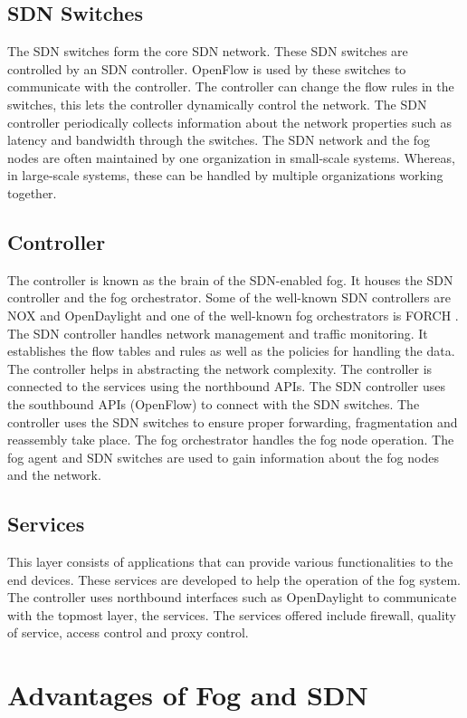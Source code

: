 \documentclass[conference]{IEEEtran}
\begin{document}
\subsection{SDN Switches}
The SDN switches form the core SDN network. These SDN switches are controlled by an SDN controller\cite{phan}. OpenFlow is used by these switches to communicate with the controller. The controller can change the flow rules in the switches, this lets the controller dynamically control the network. The SDN controller periodically collects information about the network properties such as latency and bandwidth through the switches. The SDN network and the fog nodes are often maintained by one organization in small-scale systems. Whereas, in large-scale systems, these can be handled by multiple organizations working together. 

\subsection{Controller}
The controller is known as the brain of the SDN-enabled fog\cite{benz}. It houses the SDN controller and the fog orchestrator. Some of the well-known SDN controllers are NOX \cite{hu}  and OpenDaylight \cite{med} and one of the well-known fog orchestrators is FORCH \cite{davo}. The SDN controller handles network management and traffic monitoring. It establishes the flow tables and rules as well as the policies for handling the data. The controller helps in abstracting the network complexity. The controller is connected to the services using the northbound APIs. The SDN controller uses the southbound APIs (OpenFlow) to connect with the SDN switches. The controller uses the SDN switches to ensure proper forwarding, fragmentation and reassembly take place. The fog orchestrator handles the fog node operation. The fog agent and SDN switches are used to gain information about the fog nodes and the network. 
 
 \subsection{Services}
This layer consists of applications that can provide various functionalities to the end devices. These services are developed to help the operation of the fog system. The controller uses northbound interfaces such as OpenDaylight to communicate with the topmost layer, the services. The services offered include firewall, quality of service, access control and proxy control. 

\section{Advantages of Fog and SDN}
\end{document}
